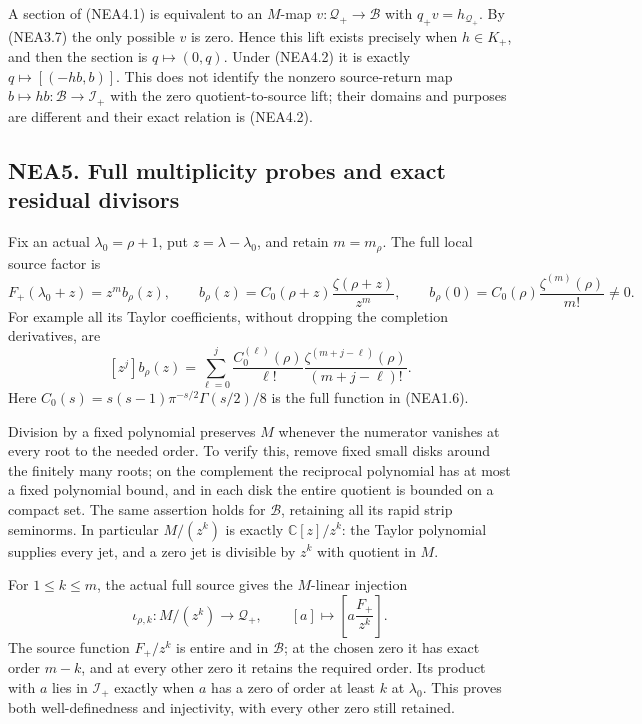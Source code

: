 A section of (NEA4.1) is equivalent to an \(M\)-map
\(v:\mathcal Q_+\to\mathcal B\) with \(q_+v=h_{\mathcal Q_+}\). By
(NEA3.7) the only possible \(v\) is zero. Hence this lift exists
precisely when \(h\in K_+\), and then the section is \(q\mapsto(0,q)\).
Under (NEA4.2) it is exactly \(q\mapsto[(-hb,b)]\). This does not
identify the nonzero source-return map
\(b\mapsto hb:\mathcal B\to\mathcal I_+\) with the zero
quotient-to-source lift; their domains and purposes are different and
their exact relation is (NEA4.2).

\subsection{NEA5. Full multiplicity probes and exact residual
divisors}\label{nea5.-full-multiplicity-probes-and-exact-residual-divisors}

Fix an actual \(\lambda_0=\rho+1\), put \(z=\lambda-\lambda_0\), and
retain \(m=m_\rho\). The full local source factor is \[
F_+(\lambda_0+z)=z^m b_\rho(z),\qquad
b_\rho(z)=C_0(\rho+z)\frac{\zeta(\rho+z)}{z^m},\qquad
b_\rho(0)=C_0(\rho)\frac{\zeta^{(m)}(\rho)}{m!}\ne0.
\tag{NEA5.1}
\] For example all its Taylor coefficients, without dropping the
completion derivatives, are \[
[z^j]b_\rho(z)
=\sum_{\ell=0}^j
\frac{C_0^{(\ell)}(\rho)}{\ell!}
\frac{\zeta^{(m+j-\ell)}(\rho)}{(m+j-\ell)!}.
\tag{NEA5.2}
\] Here \(C_0(s)=s(s-1)\pi^{-s/2}\Gamma(s/2)/8\) is the full function in
(NEA1.6).

Division by a fixed polynomial preserves \(M\) whenever the numerator
vanishes at every root to the needed order. To verify this, remove fixed
small disks around the finitely many roots; on the complement the
reciprocal polynomial has at most a fixed polynomial bound, and in each
disk the entire quotient is bounded on a compact set. The same assertion
holds for \(\mathcal B\), retaining all its rapid strip seminorms. In
particular \(M/(z^k)\) is exactly \(\mathbb C[z]/z^k\): the Taylor
polynomial supplies every jet, and a zero jet is divisible by \(z^k\)
with quotient in \(M\).

For \(1\le k\le m\), the actual full source gives the \(M\)-linear
injection \[
\iota_{\rho,k}:M/(z^k)\longrightarrow\mathcal Q_+,
\qquad [a]\longmapsto\left[a\frac{F_+}{z^k}\right].
\tag{NEA5.3}
\] The source function \(F_+/z^k\) is entire and in \(\mathcal B\); at
the chosen zero it has exact order \(m-k\), and at every other zero it
retains the required order. Its product with \(a\) lies in
\(\mathcal I_+\) exactly when \(a\) has a zero of order at least \(k\)
at \(\lambda_0\). This proves both well-definedness and injectivity,
with every other zero still retained.

